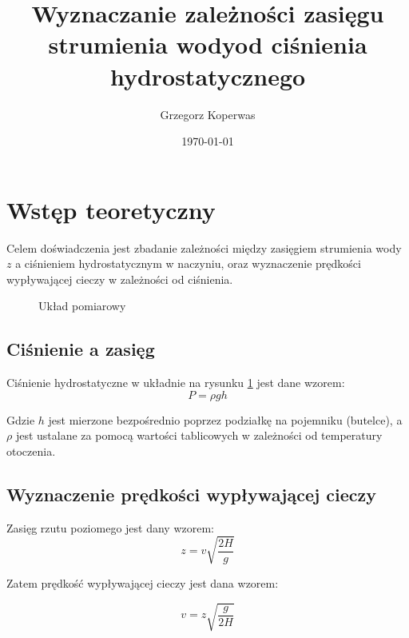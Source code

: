 \documentclass[a4paper,12pt]{article}
\title{Wyznaczanie zależności zasięgu strumienia wodyod ciśnienia hydrostatycznego}
\author{Grzegorz Koperwas}
\date{\today}
\begin{document}


\section{Wstęp teoretyczny}

Celem doświadczenia jest zbadanie zależności między zasięgiem strumienia wody $z$ a ciśnieniem hydrostatycznym w naczyniu, oraz wyznaczenie prędkości wypływającej cieczy w zależności od ciśnienia.

\begin{figure}[h]
	\centering
	\caption{Układ pomiarowy}\label{rys:układ}
\end{figure}

\subsection*{Ciśnienie a zasięg}

Ciśnienie hydrostatyczne w układnie na rysunku \ref{rys:układ} jest dane wzorem:
\[ P = \rho g h\]

Gdzie $h$ jest mierzone bezpośrednio poprzez podziałkę na pojemniku (butelce), a $\rho$ jest ustalane za pomocą wartości tablicowych w zależności od temperatury otoczenia.

\subsection*{Wyznaczenie prędkości wypływającej cieczy}

Zasięg rzutu poziomego jest dany wzorem:
\[z = v \sqrt{\frac{2 H}{g}}\]

Zatem prędkość wypływającej cieczy jest dana wzorem:

\[v = z \sqrt{\frac{g}{2 H}}\]
\end{document}
